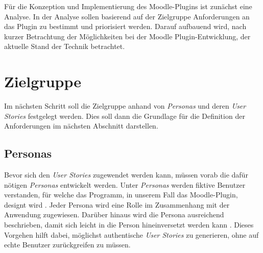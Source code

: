 \label{cha:analyse}
Für die Konzeption und Implementierung des Moodle-Plugins ist zunächst eine Analyse. In der Analyse sollen basierend auf der Zielgruppe Anforderungen an das Plugin zu bestimmt und priorisiert werden. Darauf aufbauend wird, nach kurzer Betrachtung der Möglichkeiten bei der Moodle Plugin-Entwicklung, der aktuelle Stand der Technik betrachtet.



\section{Zielgruppe}
Im nächsten Schritt soll die Zielgruppe anhand von \textit{Personas} und deren \textit{User Stories} festgelegt werden. Dies soll dann die Grundlage für die Definition der Anforderungen im nächsten Abschnitt darstellen.


\subsection{Personas}
\label{sec:personas}
Bevor sich den \textit{User Stories} zugewendet werden kann, müssen vorab die dafür nötigen \textit{Personas} entwickelt werden. Unter \textit{Personas} werden fiktive Benutzer verstanden, für welche das Programm, in unserem Fall das Moodle-Plugin, designt wird \citep{cooper2004inmates}. Jeder Persona wird eine Rolle im Zusammenhang mit der Anwendung zugewiesen. Darüber hinaus wird die Persona ausreichend beschrieben, damit sich leicht in die Person hineinversetzt werden kann \citep{cohn2004user}. Dieses Vorgehen hilft dabei, möglichst authentische \textit{User Stories} zu generieren, ohne auf echte Benutzer zurückgreifen zu müssen.




